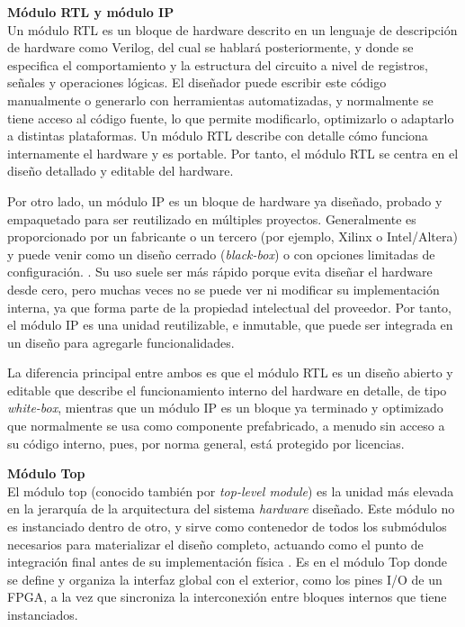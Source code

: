 \vspace{0.4em} %

\begin{adjustwidth}{1.5cm}{}
\textbf{Módulo RTL y módulo IP} \vspace{0.25cm} \\
Un módulo \ac{RTL} es un bloque de hardware descrito en un lenguaje de descripción de hardware como Verilog, del cual se hablará posteriormente, y donde se especifica el comportamiento y la estructura del circuito a nivel de registros, señales y operaciones lógicas. El diseñador puede escribir este código manualmente o generarlo con herramientas automatizadas, y normalmente se tiene acceso al código fuente, lo que permite modificarlo, optimizarlo o adaptarlo a distintas plataformas. Un módulo RTL describe con detalle cómo funciona internamente el hardware y es portable. Por tanto, el módulo RTL se centra en el diseño detallado y editable del hardware. \cite{moduloRTL}

Por otro lado, un módulo \ac{IP} es un bloque de hardware ya diseñado, probado y empaquetado para ser reutilizado en múltiples proyectos. Generalmente es proporcionado por un fabricante o un tercero (por ejemplo, Xilinx o Intel/Altera) y puede venir como un diseño cerrado (\textit{black-box}) o con opciones limitadas de configuración. \cite{moduloIP}. Su uso suele ser más rápido porque evita diseñar el hardware desde cero, pero muchas veces no se puede ver ni modificar su implementación interna, ya que forma parte de la propiedad intelectual del proveedor. Por tanto, el módulo IP es una unidad reutilizable, e inmutable, que puede ser integrada en un diseño para agregarle funcionalidades. 

La diferencia principal entre ambos es que el módulo RTL es un diseño abierto y editable que describe el funcionamiento interno del hardware en detalle, de tipo \textit{white-box}, mientras que un módulo IP es un bloque ya terminado y optimizado que normalmente se usa como componente prefabricado, a menudo sin acceso a su código interno, pues, por norma general, está protegido por licencias.
\end{adjustwidth}

\vspace{0.4em} %

\begin{adjustwidth}{1.5cm}{}
\textbf{Módulo Top} \vspace{0.25cm} \\
El módulo top (conocido también por \textit{top-level module}) es la unidad más elevada en la jerarquía de la arquitectura del sistema \textit{hardware} diseñado. Este módulo no es instanciado dentro de otro, y sirve como contenedor de todos los submódulos necesarios para materializar el diseño completo, actuando como el punto de integración final antes de su implementación física \cite{infoTop}. Es en el módulo Top donde se define y organiza la interfaz global con el exterior, como los pines I/O de un FPGA, a la vez que sincroniza la interconexión entre bloques internos que tiene instanciados.
\end{adjustwidth}

